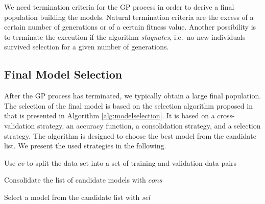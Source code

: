 \documentclass[dvipsnames,format=sigconf,anonymous=false,review=false]{acmart}
\begin{document}
  We need termination criteria for the GP process
  in order to derive a final population building the models. Natural
  termination criteria are the excess of a certain number of generations
  or of a certain fitness value. Another possibility is to terminate the
  execution if the algorithm \emph{stagnates}, i.e.\ no new individuals survived
  selection for a given number of generations.
  
  \subsection{Final Model Selection}

  After the GP process has terminated, we typically obtain a large final population. The selection of the final model is based on the selection algorithm proposed in \citet{bioinformatics24} that is presented in Algorithm \ref{alg:modelselection}. It is based on a cross-validation strategy, an accuracy function, a consolidation strategy, and a selection strategy. The algorithm is designed to choose the best model from the candidate list. We present the used strategies in the following. 
  
  \begin{algorithm}
   
    
       
    
    
    Use $cv$ to split the data set into a set of training and validation data pairs\;
 
 
    Consolidate the list of candidate models with $cons$\;
 
    Select a model from the candidate list with $sel$\;
  
 
    \caption{Automatic Model Selection\label{alg:modelselection}}
 
 \end{algorithm}
\end{document}
